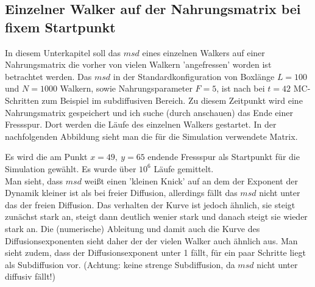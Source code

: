 \documentclass[a4paper, 12pt]{report}
\begin{document}
\newpage

\subsection{Einzelner Walker auf der Nahrungsmatrix bei fixem Startpunkt}

In diesem Unterkapitel soll das $msd$ eines einzelnen Walkers auf einer Nahrungsmatrix die vorher von vielen Walkern 'angefressen' worden ist betrachtet werden. 
Das $msd$ in der Standardkonfiguration von Boxlänge $L=100$ und $N=1000$ Walkern, sowie Nahrungsparameter $F=5$, ist nach bei $t=42$ MC-Schritten zum Beispiel im subdiffusiven Bereich. Zu diesem Zeitpunkt wird eine Nahrungsmatrix gespeichert und ich suche (durch anschauen) das Ende einer Fressspur. Dort werden die Läufe des einzelnen Walkers gestartet. 
In der nachfolgenden Abbildung sieht man die für die Simulation verwendete Matrix.



\noindent Es wird die am Punkt $x=49,\ y=65$ endende Fressspur als Startpunkt für die Simulation gewählt. Es wurde über $10^6$ Läufe gemittelt.
\\
Man sieht, dass $msd$ weißt einen 'kleinen Knick' auf an dem der Exponent der Dynamik kleiner ist als bei freier Diffusion, allerdings fällt das $msd$ nicht unter das der freien Diffusion. Das verhalten der Kurve ist jedoch ähnlich, sie steigt zunächst stark an, steigt dann deutlich wenier stark und danach steigt sie wieder stark an. Die (numerische) Ableitung und damit auch die Kurve des Diffusionsexponenten sieht daher der der vielen Walker auch ähnlich aus. Man sieht zudem, dass der Diffusionsexponent unter 1 fällt, für ein paar Schritte liegt als Subdiffusion vor. (Achtung: keine strenge Subdiffusion, da $msd$ nicht unter diffusiv fällt!)
\end{document}
